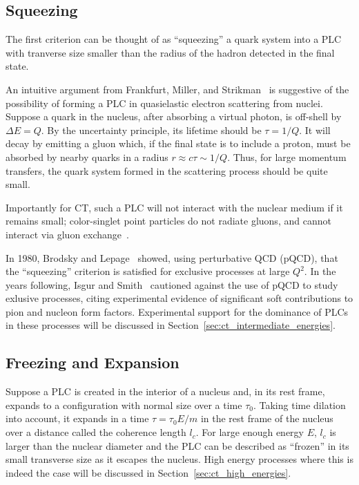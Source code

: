 \subsection{Squeezing}
The first criterion can be thought of as ``squeezing'' a quark system into a
PLC with tranverse size smaller than the radius of the hadron detected in
the final state.




An intuitive argument from Frankfurt, Miller, and
Strikman~\cite{Frankfurt_1992} is suggestive of the possibility of forming a
PLC in quasielastic electron scattering from nuclei.
Suppose a quark in the nucleus, after absorbing a virtual photon, is off-shell
by $\Delta E = Q$.
By the uncertainty principle, its lifetime should be $\tau=1/Q$.
It will decay by emitting a gluon which, if the final state is to include a
proton, must be absorbed by nearby quarks in a radius
$r \approx c \tau \sim 1/Q$.
Thus, for large momentum transfers, the quark system formed in the scattering
process should be quite small.


Importantly for CT, such a PLC will not interact with the nuclear medium if it
remains small; color-singlet point particles do not radiate gluons, and cannot
interact via gluon exchange~\cite{Gunion_1977}.


In 1980, Brodsky and Lepage~\cite{Brodsky_1980, Lepage_1980} showed, using
perturbative QCD (pQCD), that the ``squeezing'' criterion is satisfied for
exclusive processes at large $Q^2$.
In the years following, Isgur and Smith~\cite{Isgur_1984, Isgur_1988,
Isgur_1989} cautioned against the use of pQCD to study exlusive processes,
citing experimental evidence of significant soft contributions to pion and
nucleon form factors.
Experimental support for the dominance of PLCs in these processes will be
discussed in Section~\ref{sec:ct_intermediate_energies}.


\subsection{Freezing and Expansion}
Suppose a PLC is created in the interior of a nucleus and, in its rest frame,
expands to a configuration with normal size over a time $\tau_0$.
Taking time dilation into account, it expands in a time $\tau=\tau_0E/m$ in the
rest frame of the nucleus over a distance called the coherence length $l_c$.
For large enough energy $E$, $l_c$ is larger than the nuclear diameter and the
PLC can be described as ``frozen'' in its small transverse size as it escapes
the nucleus.
High energy processes where this is indeed the case will be discussed in
Section~\ref{sec:ct_high_energies}.


